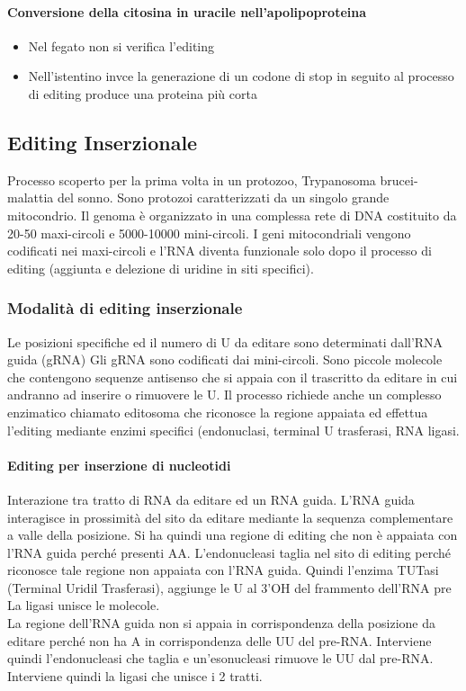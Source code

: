 \documentclass{article}
\begin{document}
\paragraph{Conversione della citosina in uracile nell'apolipoproteina}
\begin{itemize}
    \item Nel fegato non si verifica l'editing
    \item Nell'istentino invce la generazione di un codone di stop in seguito al processo di editing produce una proteina più corta
\end{itemize}
\subsection{Editing Inserzionale}
Processo scoperto per la prima volta in un protozoo, Trypanosoma brucei-malattia del sonno. Sono protozoi caratterizzati da un singolo grande mitocondrio. Il genoma è
organizzato in una complessa rete di DNA costituito da 20-50 maxi-circoli e
5000-10000 mini-circoli. I geni mitocondriali vengono codificati nei maxi-circoli e l'RNA diventa
funzionale solo dopo il processo di editing (aggiunta e delezione di
uridine in siti specifici).
\subsubsection{Modalità di editing inserzionale}
Le posizioni specifiche ed il numero di U da editare sono determinati dall'RNA guida (gRNA)
Gli gRNA sono codificati dai mini-circoli. Sono piccole molecole che contengono sequenze antisenso che si
appaia con il trascritto da editare in cui andranno ad inserire o rimuovere le U. Il processo richiede anche un complesso enzimatico chiamato editosoma che riconosce la regione
appaiata ed effettua l'editing mediante enzimi specifici (endonuclasi, terminal U trasferasi, RNA ligasi.
\paragraph{Editing per inserzione di nucleotidi}
Interazione tra tratto di RNA da editare ed un RNA guida. L'RNA guida
interagisce in prossimità del sito da editare mediante la sequenza
complementare a valle della posizione. Si ha quindi una regione di
editing che non è appaiata con l'RNA guida perché presenti AA.
L'endonucleasi taglia nel sito di editing perché riconosce tale regione
non appaiata con l'RNA guida. Quindi l'enzima TUTasi (Terminal Uridil
Trasferasi), aggiunge le U al 3'OH del frammento dell'RNA pre La ligasi unisce le molecole.\\
La regione dell'RNA guida non si appaia in corrispondenza della posizione da editare perché non ha A in corrispondenza delle UU del pre-RNA.
Interviene quindi l'endonucleasi che taglia e un'esonucleasi rimuove le UU dal pre-RNA. Interviene quindi la ligasi che unisce i 2 tratti.
\end{document}
